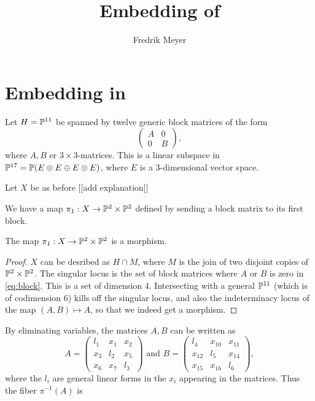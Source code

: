 \documentclass[11pt, english]{article}
\begin{document}
\title{Embedding of }
\author{Fredrik Meyer}
\maketitle


\section{Embedding in }

Let $H=\mathbb{P}^{11}$ be spanned by twelve generic block matrices of the form
\begin{equation}
\label{eq:block}
\begin{pmatrix}
A & 0 \\
0 & B
\end{pmatrix},
\end{equation}
where $A,B$ er $3 \times 3$-matrices. This is a linear subspace in $\mathbb{P}^{17}=\mathbb{P}(E \otimes E \oplus E \otimes E)$, where $E$ is a 3-dimensional vector space.


Let $X$ be as before [[add explanation]]

We have a map $\pi_1: X \to \mathbb{P}^2 \times \mathbb{P}^2$ defined by sending a block matrix to its first block.

\begin{prop}
The map $\pi_1:X \to \mathbb{P}^2 \times \mathbb{P}^2$ is a morphism.
\end{prop}
\begin{proof}
$X$ can be desribed as $H \cap M$, where $M$ is the join of two disjoint copies of $\mathbb{P}^2 \times \mathbb{P}^2$. The singular locus is the set of block matrices where $A$ or $B$ is zero in \eqref{eq:block}. This is a set of dimension $4$. Intersecting with a general $\mathbb{P}^{11}$ (which is of codimension $6$) kills off the singular locus, and also the indeterminacy locus of the map $(A,B) \mapsto A$, so that we indeed get a morphism.
\end{proof}


By eliminating variables, the matrices $A,B$ can be written as
\[
A =
\begin{pmatrix}
l_1 & x_1 & x_2 \\
x_3 & l_2 & x_5 \\
x_6 & x_7 & l_3
\end{pmatrix} \text{ and }
B = 
\begin{pmatrix}
l_4 & x_{10} & x_{11} \\
x_{12} & l_5 & x_{14} \\
x_{15} & x_{16} & l_6
\end{pmatrix},
\]
where the $l_i$ are general linear forms in the $x_i$ appearing in the matrices. Thus the fiber $\pi^{-1}(A)$ is
\end{document}

